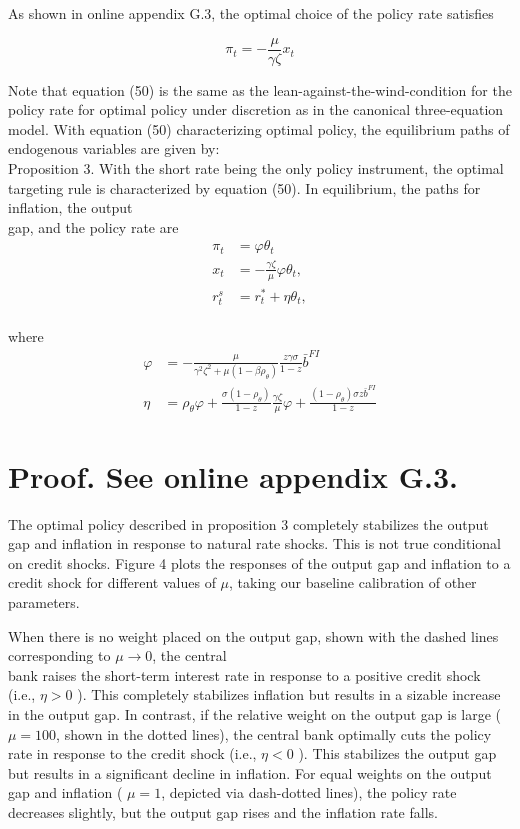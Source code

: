 \documentclass[10pt]{article}
\begin{document}
As shown in online appendix G.3, the optimal choice of the policy rate satisfies

\begin{equation*}
\pi_{t}=-\frac{\mu}{\gamma \zeta} x_{t} \tag{50}
\end{equation*}

Note that equation (50) is the same as the lean-against-the-wind-condition for the policy rate for optimal policy under discretion as in the canonical three-equation model. With equation (50) characterizing optimal policy, the equilibrium paths of endogenous variables are given by:\\
Proposition 3. With the short rate being the only policy instrument, the optimal targeting rule is characterized by equation (50). In equilibrium, the paths for inflation, the output\\
gap, and the policy rate are\\
\begin{align*}
\pi_{t} & =\varphi \theta_{t}  \tag{51}\\
x_{t} & =-\frac{\gamma \zeta}{\mu} \varphi \theta_{t},  \tag{52}\\
r_{t}^{s} & =r_{t}^{*}+\eta \theta_{t}, \tag{53}
\end{align*}\\
where\\
\begin{align*}
\varphi & =-\frac{\mu}{\gamma^{2} \zeta^{2}+\mu\left(1-\beta \rho_{\theta}\right)} \frac{z \gamma \sigma}{1-z} \bar{b}^{F I}  \tag{54}\\
\eta & =\rho_{\theta} \varphi+\frac{\sigma\left(1-\rho_{\theta}\right)}{1-z} \frac{\gamma \zeta}{\mu} \varphi+\frac{\left(1-\rho_{\theta}\right) \sigma z \bar{b}^{F I}}{1-z} \tag{55}
\end{align*}

\section*{Proof. See online appendix G.3.}
The optimal policy described in proposition 3 completely stabilizes the output gap and inflation in response to natural rate shocks. This is not true conditional on credit shocks. Figure 4 plots the responses of the output gap and inflation to a credit shock for different values of $\mu$, taking our baseline calibration of other parameters.

When there is no weight placed on the output gap, shown with the dashed lines corresponding to $\mu \rightarrow 0$, the central\\
bank raises the short-term interest rate in response to a positive credit shock (i.e., $\eta>0$ ). This completely stabilizes inflation but results in a sizable increase in the output gap. In contrast, if the relative weight on the output gap is large ( $\mu=100$, shown in the dotted lines), the central bank optimally cuts the policy rate in response to the credit shock (i.e., $\eta<0$ ). This stabilizes the output gap but results in a significant decline in inflation. For equal weights on the output gap and inflation ( $\mu=1$, depicted via dash-dotted lines), the policy rate decreases slightly, but the output gap rises and the inflation rate falls.
\end{document}
